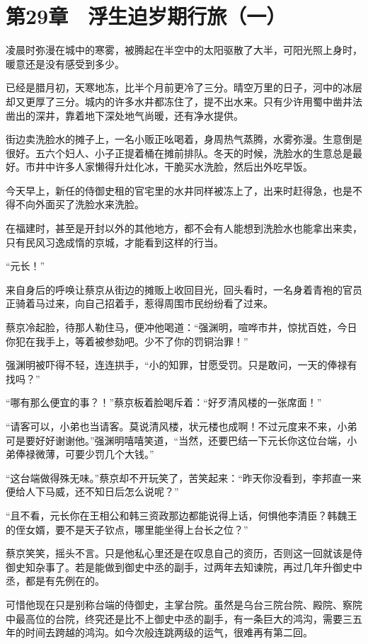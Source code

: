 \section{第29章　浮生迫岁期行旅（一）}

凌晨时弥漫在城中的寒雾，被腾起在半空中的太阳驱散了大半，可阳光照上身时，暖意还是没有感受到多少。

已经是腊月初，天寒地冻，比半个月前更冷了三分。晴空万里的日子，河中的冰层却又更厚了三分。城内的许多水井都冻住了，提不出水来。只有少许用蜀中凿井法凿出的深井，靠着地下深处地气尚暖，还有净水提供。

街边卖洗脸水的摊子上，一名小贩正吆喝着，身周热气蒸腾，水雾弥漫。生意倒是很好。五六个妇人、小子正提着桶在摊前排队。冬天的时候，洗脸水的生意总是最好。市井中许多人家懒得升灶化冰，干脆买水洗脸，然后出外吃早饭。

今天早上，新任的侍御史租的官宅里的水井同样被冻上了，出来时赶得急，也是不得不向外面买了洗脸水来洗脸。

在福建时，甚至是开封以外的其他地方，都不会有人能想到洗脸水也能拿出来卖，只有民风习逸成惰的京城，才能看到这样的行当。

“元长！”

来自身后的呼唤让蔡京从街边的摊贩上收回目光，回头看时，一名身着青袍的官员正骑着马过来，向自己招着手，惹得周围市民纷纷看了过来。

蔡京冷起脸，待那人勒住马，便冲他喝道：“强渊明，喧哗市井，惊扰百姓，今日你犯在我手上，等着被参劾吧。少不了你的罚铜治罪！”

强渊明被吓得不轻，连连拱手，“小的知罪，甘愿受罚。只是敢问，一天的俸禄有找吗？”

“哪有那么便宜的事？！”蔡京板着脸喝斥着：“好歹清风楼的一张席面！”

“请客可以，小弟也当请客。莫说清风楼，状元楼也成啊！不过元度来不来，小弟可是要好好谢谢他。”强渊明嘻嘻笑道，“当然，还要巴结一下元长你这位台端，小弟俸禄微薄，可要少罚几个大钱。”

“这台端做得殊无味。”蔡京却不开玩笑了，苦笑起来：“昨天你没看到，李邦直一来便给人下马威，还不知日后怎么说呢？”

“且不看，元长你在王相公和韩三资政那边都能说得上话，何惧他李清臣？韩魏王的侄女婿，要不是天子钦点，哪里能坐得上台长之位？”

蔡京笑笑，摇头不言。只是他私心里还是在叹息自己的资历，否则这一回就该是侍御史知杂事了。若是能做到御史中丞的副手，过两年去知谏院，再过几年升御史中丞，都是有先例在的。

可惜他现在只是别称台端的侍御史，主掌台院。虽然是乌台三院台院、殿院、察院中最高位的台院，终究还是比不上御史中丞的副手，有一条巨大的鸿沟，需要三五年的时间去跨越的鸿沟。如今次般连跳两级的运气，很难再有第二回。

